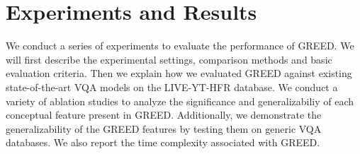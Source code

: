 \documentclass[journal]{IEEEtran}
\begin{document}
\section{Experiments and Results}
\label{sec:experiments}
We conduct a series of experiments to evaluate the performance of GREED. We will first describe the experimental settings, comparison methods and basic evaluation criteria. Then we explain how we evaluated GREED against existing state-of-the-art VQA models on the LIVE-YT-HFR database. We conduct a variety of ablation studies to analyze the significance and generalizabiliy of each conceptual feature present in GREED. Additionally, we demonstrate the generalizability of the GREED features by testing them on generic VQA databases. We also report the time complexity associated with GREED.

\begin{table*}[t]
	\caption{Performance comparison of GREED against various FR methods for individual frame rates on the LIVE-YT-HFR Database.}
	\label{Table:FPS_comparison}
	\centering
	\scriptsize
\end{table*}
\end{document}
